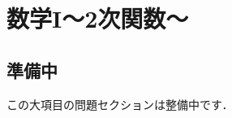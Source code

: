 \documentclass[../../ms_q.tex]{subfiles}
\begin{document}
\section{数学I～2次関数～}

\subsection*{準備中}
この大項目の問題セクションは整備中です．
\end{document}
